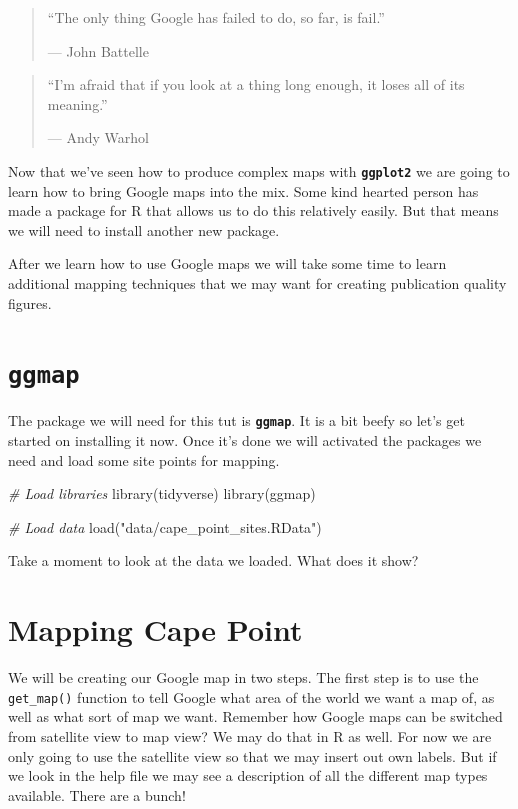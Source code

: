 \documentclass[
]{book}
\newenvironment{Shaded}{\begin{snugshade}}{\end{snugshade}}
\newcommand{\CommentTok}[1]{\textcolor[rgb]{0.56,0.35,0.01}{\textit{#1}}}
\newcommand{\FunctionTok}[1]{\textcolor[rgb]{0.00,0.00,0.00}{#1}}
\newcommand{\NormalTok}[1]{#1}
\newcommand{\StringTok}[1]{\textcolor[rgb]{0.31,0.60,0.02}{#1}}
\begin{document}
\begin{quote}
``The only thing Google has failed to do, so far, is fail.''

--- John Battelle
\end{quote}

\begin{quote}
``I'm afraid that if you look at a thing long enough, it loses all of its meaning.''

--- Andy Warhol
\end{quote}

Now that we've seen how to produce complex maps with \textbf{\texttt{ggplot2}} we are going to learn how to bring Google maps into the mix. Some kind hearted person has made a package for R that allows us to do this relatively easily. But that means we will need to install another new package.

After we learn how to use Google maps we will take some time to learn additional mapping techniques that we may want for creating publication quality figures.

\hypertarget{ggmap}{%
\section{\texorpdfstring{\textbf{\texttt{ggmap}}}{ggmap}}\label{ggmap}}

The package we will need for this tut is \textbf{\texttt{ggmap}}. It is a bit beefy so let's get started on installing it now. Once it's done we will activated the packages we need and load some site points for mapping.

\begin{Shaded}
\begin{Highlighting}[]
\CommentTok{\# Load libraries}
\FunctionTok{library}\NormalTok{(tidyverse)}
\FunctionTok{library}\NormalTok{(ggmap)}

\CommentTok{\# Load data}
\FunctionTok{load}\NormalTok{(}\StringTok{"data/cape\_point\_sites.RData"}\NormalTok{)}
\end{Highlighting}
\end{Shaded}

Take a moment to look at the data we loaded. What does it show?

\hypertarget{mapping-cape-point}{%
\section{Mapping Cape Point}\label{mapping-cape-point}}

We will be creating our Google map in two steps. The first step is to use the \texttt{get\_map()} function to tell Google what area of the world we want a map of, as well as what sort of map we want. Remember how Google maps can be switched from satellite view to map view? We may do that in R as well. For now we are only going to use the satellite view so that we may insert out own labels. But if we look in the help file we may see a description of all the different map types available. There are a bunch!
\end{document}

